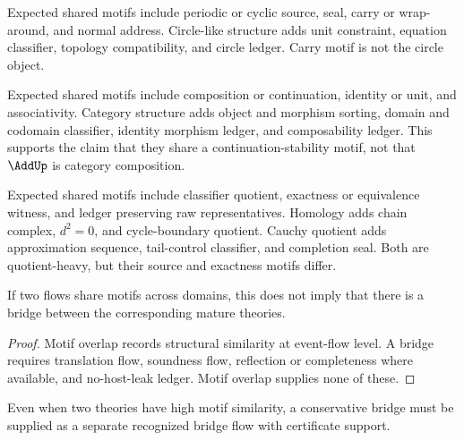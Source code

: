 \begin{example}
\label{ex:higher-case-phase-circle}
Expected shared motifs include periodic or cyclic source, seal, carry or wrap-around, and normal address. Circle-like structure adds unit constraint, equation classifier, topology compatibility, and circle ledger. Carry motif is not the circle object.
\end{example}

\begin{example}
\label{ex:higher-case-add-category}
Expected shared motifs include composition or continuation, identity or unit, and associativity. Category structure adds object and morphism sorting, domain and codomain classifier, identity morphism ledger, and composability ledger. This supports the claim that they share a continuation-stability motif, not that $\AddUp$ is category composition.
\end{example}

\begin{example}
\label{ex:higher-case-homology-quotient}
Expected shared motifs include classifier quotient, exactness or equivalence witness, and ledger preserving raw representatives. Homology adds chain complex, $d^2=0$, and cycle-boundary quotient. Cauchy quotient adds approximation sequence, tail-control classifier, and completion seal. Both are quotient-heavy, but their source and exactness motifs differ.
\end{example}

\begin{theorem}
\label{thm:higher-case-overlap-not-bridge}
If two flows share motifs across domains, this does not imply that there is a bridge between the corresponding mature theories.
\end{theorem}

\begin{proof}
Motif overlap records structural similarity at event-flow level. A bridge requires translation flow, soundness flow, reflection or completeness where available, and no-host-leak ledger. Motif overlap supplies none of these.
\end{proof}

\begin{corollary}
\label{cor:higher-case-bridge-needs-cert}
Even when two theories have high motif similarity, a conservative bridge must be supplied as a separate recognized bridge flow with certificate support.
\end{corollary}

